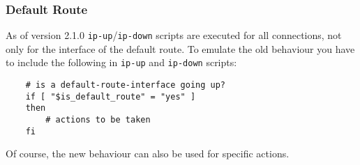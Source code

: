 \subsubsection{Default Route}

As of version 2.1.0 \texttt{ip-up}/\texttt{ip-down} scripts are executed for
all connections, not only for the interface of the default route. To emulate the
old behaviour you have to include the following in \texttt{ip-up} and \texttt{ip-down}
scripts:

\begin{example}
\begin{verbatim}
    # is a default-route-interface going up?
    if [ "$is_default_route" = "yes" ]
    then
        # actions to be taken
    fi
\end{verbatim}
\end{example}


Of course, the new behaviour can also be used for specific actions.
